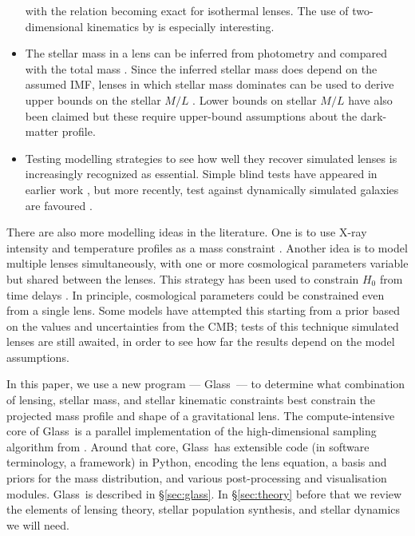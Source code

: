 \documentclass[galley,usenatbib]{mn2e}
\newcommand{\Glass}{{\sc Glass}}
\newcommand{\secref}[1] {\S\ref{#1}}
\begin{document}
\begin{itemize}
  with the relation becoming exact for isothermal lenses.  The use of
  two-dimensional kinematics by \cite{2011MNRAS.415.2215B} is
  especially interesting.
\item The stellar mass in a lens can be inferred from photometry and
  compared with the total mass
  \citep{2005ApJ...623L...5F,2008MNRAS.383..857F,2011ApJ...740...97L}.
  Since the inferred stellar mass does depend on the assumed IMF,
  lenses in which stellar mass dominates can be used to derive upper
  bounds on the stellar $M/L$ \cite{2010MNRAS.409L..30F}. Lower bounds
  on stellar $M/L$ have also been claimed \citep{2013MNRAS.428.3183D}
  but these require upper-bound assumptions about the dark-matter
  profile.
\item Testing modelling strategies to see how well they recover
  simulated lenses is increasingly recognized as essential.  Simple
  blind tests have appeared in earlier work \citep[for example, Figure
    2 in][]{2000AJ....119..439W}, but more recently, test against
  dynamically simulated galaxies are favoured
  \citep{2007ApJ...667..645R,2009MNRAS.393.1114B}.
\end{itemize}
There are also more modelling ideas in the literature.  One is to use
X-ray intensity and temperature profiles as a mass constraint
\citep[such as in][]{2013ApJ...765...25N}.  Another idea is to model
multiple lenses simultaneously, with one or more cosmological
parameters variable but shared between the lenses.  This strategy has
been used to constrain $H_0$ from time delays
\citep{2006ApJ...652L...5S,2008ApJ...679...17C,2010ApJ...712.1378P}.
In principle, cosmological parameters could be constrained even from a
single lens.  Some models have attempted this
\citep{2010Sci...329..924J,2013arXiv1306.4732S} starting from a prior
based on the values and uncertainties from the CMB; tests of this
technique simulated lenses are still awaited, in order to see how far
the results depend on the model assumptions.

In this paper, we use a new program --- \Glass\ --- to determine what
combination of lensing, stellar mass, and stellar kinematic
constraints best constrain the projected mass profile and shape of a
gravitational lens.  The compute-intensive core of \Glass\ is a
parallel implementation of the high-dimensional sampling algorithm
from \cite{2012MNRAS.425.3077L}.  Around that core, \Glass\ has
extensible code (in software terminology, a framework) in Python,
encoding the lens equation, a basis and priors for the mass
distribution, and various post-processing and visualisation modules.  \Glass\
is described in \secref{sec:glass}.  In \secref{sec:theory} before that we
review the elements of lensing theory, stellar population synthesis, and
stellar dynamics we will need.
\end{document}
